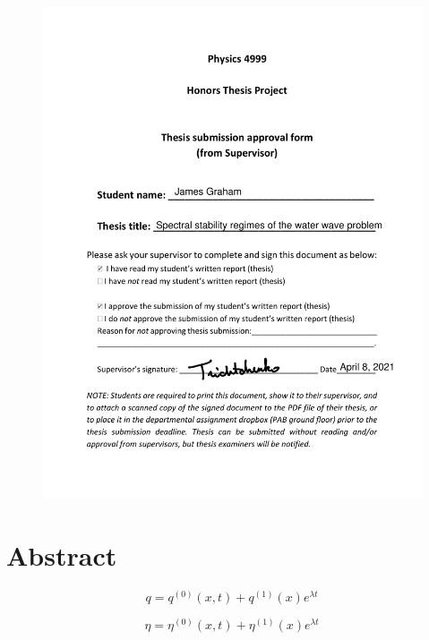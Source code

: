 \documentclass{article}
\begin{document}
\setlength{\parindent}{0pt}

\begin{figure}
    \centering
    \includegraphics[scale = .9]{Thesisapproval.png}
    \label{fig:my_label}
\end{figure}

\clearpage

\section{Abstract}


\begin{equation}
    q = q^{(0)}(x,t) + q^{(1)}(x)e^{\lambda t}
    
\end{equation}

\begin{equation}
    \eta = \eta^{(0)}(x,t) + \eta^{(1)}(x)e^{\lambda t}
    
\end{equation}
\end{document}
